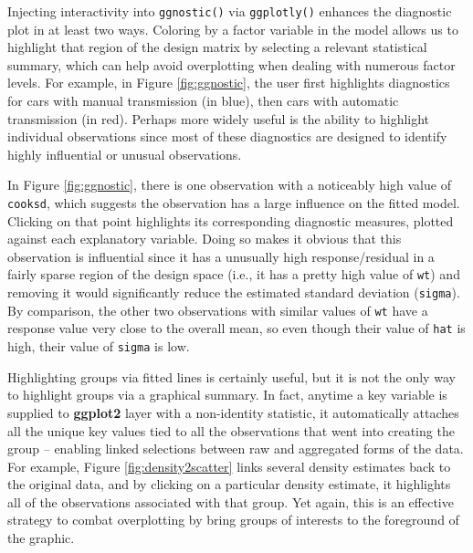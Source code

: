 \documentclass[12pt,]{isuthesis}
\newenvironment{Shaded}{\begin{snugshade}}{\end{snugshade}}
\newcommand{\KeywordTok}[1]{\textcolor[rgb]{0.13,0.29,0.53}{\textbf{{#1}}}}
\newcommand{\DataTypeTok}[1]{\textcolor[rgb]{0.13,0.29,0.53}{{#1}}}
\newcommand{\StringTok}[1]{\textcolor[rgb]{0.31,0.60,0.02}{{#1}}}
\newcommand{\NormalTok}[1]{{#1}}
\begin{document}
Injecting interactivity into \texttt{ggnostic()} via \texttt{ggplotly()}
enhances the diagnostic plot in at least two ways. Coloring by a factor
variable in the model allows us to highlight that region of the design
matrix by selecting a relevant statistical summary, which can help avoid
overplotting when dealing with numerous factor levels. For example, in
Figure \ref{fig:ggnostic}, the user first highlights diagnostics for
cars with manual transmission (in blue), then cars with automatic
transmission (in red). Perhaps more widely useful is the ability to
highlight individual observations since most of these diagnostics are
designed to identify highly influential or unusual observations.

In Figure \ref{fig:ggnostic}, there is one observation with a noticeably
high value of \texttt{cooksd}, which suggests the observation has a
large influence on the fitted model. Clicking on that point highlights
its corresponding diagnostic measures, plotted against each explanatory
variable. Doing so makes it obvious that this observation is influential
since it has a unusually high response/residual in a fairly sparse
region of the design space (i.e., it has a pretty high value of
\texttt{wt}) and removing it would significantly reduce the estimated
standard deviation (\texttt{sigma}). By comparison, the other two
observations with similar values of \texttt{wt} have a response value
very close to the overall mean, so even though their value of
\texttt{hat} is high, their value of \texttt{sigma} is low.

Highlighting groups via fitted lines is certainly useful, but it is not
the only way to highlight groups via a graphical summary. In fact,
anytime a key variable is supplied to \textbf{ggplot2} layer with a
non-identity statistic, it automatically attaches all the unique key
values tied to all the observations that went into creating the group --
enabling linked selections between raw and aggregated forms of the data.
For example, Figure \ref{fig:density2scatter} links several density
estimates back to the original data, and by clicking on a particular
density estimate, it highlights all of the observations associated with
that group. Yet again, this is an effective strategy to combat
overplotting by bring groups of interests to the foreground of the
graphic.

\begin{Shaded}
\end{Shaded}
\end{document}
